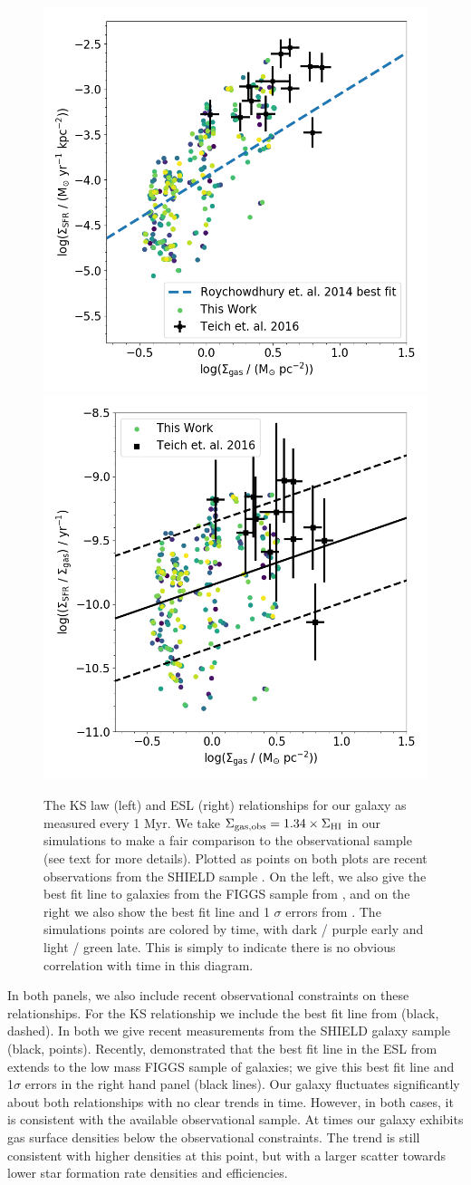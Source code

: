 \documentclass[twocolumn]{aastex61}
\begin{document}
\begin{figure}
\centering
\includegraphics[width=0.475\linewidth]{all_gas_schmidt_law_evolution}
\includegraphics[width=0.475\linewidth]{all_gass_efficiency_evolution}
\caption{The KS law (left) and ESL (right) relationships for our galaxy as measured every 1 Myr. We take $\Sigma_{\rm gas, obs} = 1.34 \times \Sigma_{\rm HI}$ in our simulations to make a fair comparison to the observational sample (see text for more details). Plotted as points on both plots are recent observations from the SHIELD sample \citep{Teich2016}. On the left, we also give the best fit line to galaxies from the FIGGS sample from \cite{Roychowdhury2014}, and on the right we also show the best fit line and 1 $\sigma$ errors from \cite{Shi2011}. The simulations points are colored by time, with dark / purple early and light / green late. This is simply to indicate there is no obvious correlation with time in this diagram.}
\label{fig:KS}
\end{figure}

In both panels, we also include recent observational constraints on these relationships. For the KS relationship we include the best fit line from \citet{Roychowdhury2014} (black, dashed). In both we give recent measurements from the SHIELD galaxy sample \citep{Teich2016} (black, points). Recently, \cite{Roychowdhury2017} demonstrated that the best fit line in the ESL from \cite{Shi2011} extends to the low mass FIGGS sample of galaxies; we give this best fit line and 1$\sigma$ errors in the right hand panel (black lines). Our galaxy fluctuates significantly about both relationships with no clear trends in time. However, in both cases, it is consistent with the available observational sample. At times our galaxy exhibits gas surface densities below the observational constraints. The trend is still consistent with higher densities at this point, but with a larger scatter towards lower star formation rate densities and efficiencies.
\end{document}

